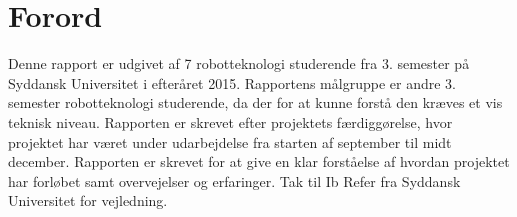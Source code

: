 \section*{Forord}
Denne rapport er udgivet af 7 robotteknologi studerende fra 3. semester på Syddansk Universitet i efteråret 2015.
Rapportens målgruppe er andre 3. semester robotteknologi studerende, da der for at kunne forstå den kræves et vis teknisk niveau.
Rapporten er skrevet efter projektets færdiggørelse, hvor projektet har været under udarbejdelse fra starten af september til midt december.
Rapporten er skrevet for at give en klar forståelse af hvordan projektet har forløbet samt overvejelser og erfaringer.
Tak til Ib Refer fra Syddansk Universitet for vejledning.